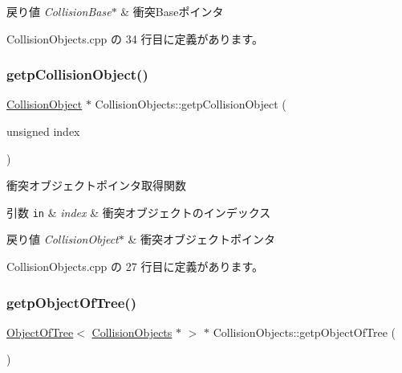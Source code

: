 \begin{DoxyRetVals}{戻り値}
{\em Collision\+Base$\ast$} & 衝突\+Baseポインタ \\
\hline
\end{DoxyRetVals}


 Collision\+Objects.\+cpp の 34 行目に定義があります。

\mbox{\label{class_collision_objects_abbd4e5dff1d28f403125637edd08b780}} 
\subsubsection{\texorpdfstring{getp\+Collision\+Object()}{getpCollisionObject()}}
{\footnotesize\ttfamily \mbox{\hyperlink{class_collision_object}{Collision\+Object}} $\ast$ Collision\+Objects\+::getp\+Collision\+Object (\begin{DoxyParamCaption}\item[{unsigned}]{index }\end{DoxyParamCaption})}



衝突オブジェクトポインタ取得関数 


\begin{DoxyParams}[1]{引数}
\mbox{\tt in}  & {\em index} & 衝突オブジェクトのインデックス \\
\hline
\end{DoxyParams}

\begin{DoxyRetVals}{戻り値}
{\em Collision\+Object$\ast$} & 衝突オブジェクトポインタ \\
\hline
\end{DoxyRetVals}


 Collision\+Objects.\+cpp の 27 行目に定義があります。

\mbox{\label{class_collision_objects_aed262a89043cfb50a9211a35587d6ade}} 
\subsubsection{\texorpdfstring{getp\+Object\+Of\+Tree()}{getpObjectOfTree()}}
{\footnotesize\ttfamily \mbox{\hyperlink{class_object_of_tree}{Object\+Of\+Tree}}$<$ \mbox{\hyperlink{class_collision_objects}{Collision\+Objects}} $\ast$ $>$ $\ast$ Collision\+Objects\+::getp\+Object\+Of\+Tree (\begin{DoxyParamCaption}{ }\end{DoxyParamCaption})}



